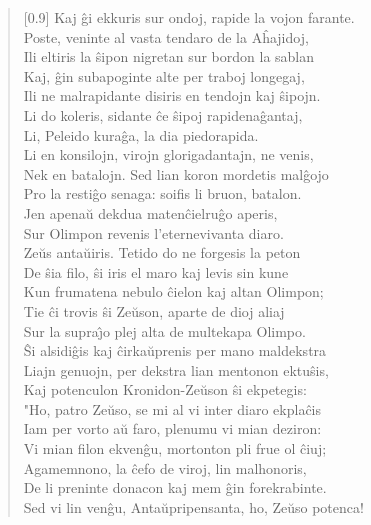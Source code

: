 \begin{verse}[0.9\textwidth]
          Kaj \^gi ekkuris sur ondoj, rapide la vojon farante.\\
          Poste, veninte al vasta tendaro de la A\^hajidoj,\\
          Ili eltiris la \^sipon nigretan sur bordon la sablan\\
          Kaj, \^gin subapoginte alte per traboj longegaj,\\
          Ili ne malrapidante disiris en tendojn kaj \^sipojn.\\
          Li do koleris, sidante \^ce \^sipoj rapidena\^gantaj,\\
          Li, Peleido kura\^ga, la dia piedorapida.\\
          \vin   Li en konsilojn, virojn glorigadantajn, ne venis,\\
          Nek en batalojn. Sed lian koron mordetis mal\^gojo\\
          Pro la resti\^go senaga: soifis li bruon, batalon.\\
          \vin   Jen apena\u u dekdua maten\^cielru\^go aperis,\\
          Sur Olimpon revenis l'eternevivanta diaro.\\
          Ze\u us anta\u uiris. Tetido do ne forgesis la peton\\
          De \^sia filo, \^si iris el maro kaj levis sin kune\\
          Kun frumatena nebulo \^cielon kaj altan Olimpon;\\
          Tie \^ci trovis \^si Ze\u uson, aparte de dioj aliaj\\
          Sur la supra\^{\j}o plej alta de multekapa Olimpo.\\
          \^Si alsidi\^gis kaj \^cirka\u uprenis per mano maldekstra\\
          Liajn genuojn, per dekstra lian mentonon ektu\^sis,\\
          Kaj potenculon Kronidon-Ze\u uson \^si ekpetegis:\\
          \vin   "Ho, patro Ze\u uso, se mi al vi inter diaro ekpla\^cis\\
          Iam per vorto a\u u faro, plenumu vi mian deziron:\\
          Vi mian filon ekven\^gu, mortonton pli frue ol \^ciuj;\\
          Agamemnono, la \^cefo de viroj, lin malhonoris,\\
          De li preninte donacon kaj mem \^gin forekrabinte.\\
          Sed vi lin ven\^gu, Anta\u upripensanta, ho, Ze\u uso potenca!\\

\end{verse}
